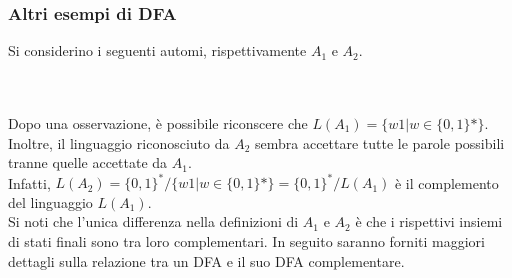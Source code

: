 \documentclass[]{article}
\begin{document}
\subsubsection{Altri esempi di DFA}

Si considerino i seguenti automi, rispettivamente \mbox{$A_1$} e \mbox{$A_2$}.
\\
\\
\\
Dopo una osservazione, è possibile riconscere che \mbox{$ L(A_1) = \{ w1 | w \in \{ 0, 1 \}* \} $}.
Inoltre, il linguaggio riconosciuto da \mbox{$A_2$} sembra accettare tutte le parole possibili tranne
quelle accettate da \mbox{$A_1$}.
\\
Infatti, \mbox{$ L(A_2) = \{ 0, 1 \}^* / \{ w1 | w \in \{ 0, 1 \}* \} = \{ 0, 1 \}^* / L(A_1) $} è il
complemento del linguaggio \mbox{$L(A_1)$}.
\\
Si noti che l'unica differenza nella definizioni di \mbox{$A_1$} e \mbox{$A_2$} è che i rispettivi
insiemi di stati finali sono tra loro complementari. In seguito saranno forniti maggiori dettagli sulla
relazione tra un DFA e il suo DFA complementare.


\newpage
\end{document}
